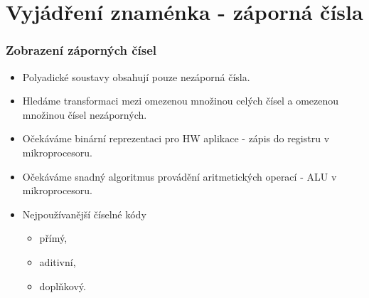 \section{\texorpdfstring{Vyjádření znaménka - záporná čísla}{Vyjadreni znamenka - zaporna cisla}}

	\begin{frame}
    \frametitle{Zobrazení záporných čísel}
		\boldmath
    
    \begin{itemize}
      \item Polyadické soustavy obsahují pouze nezáporná čísla.
      \item Hledáme transformaci mezi omezenou množinou celých čísel a omezenou množinou čísel nezáporných.
      \item Očekáváme binární reprezentaci pro HW aplikace - zápis do registru v mikroprocesoru.
      \item Očekáváme snadný algoritmus provádění aritmetických operací - ALU v mikroprocesoru.
      \item Nejpoužívanější číselné kódy
      
      \begin{itemize}
        \item přímý,
        \item aditivní,
        \item doplňkový.
      \end{itemize}
      
    \end{itemize}
    
	\end{frame}
  

